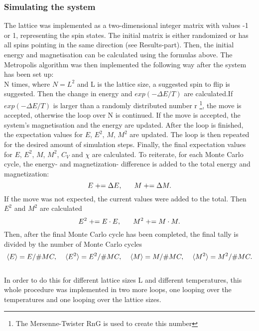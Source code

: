 \documentclass[10pt,a4paper]{article}
\begin{document}
\subsubsection{Simulating the system}
The lattice was implemented as a two-dimensional integer matrix with values -1 or 1, representing the spin states. The initial matrix is either randomized or has all spins pointing in the same direction (see Results-part). 
Then, the initial energy and magnetisation can be calculated using the formulas above.
The Metropolis algorithm was then implemented the following way after the system has been set up:\\
N times, where $N=L^2$ and L is the lattice size, a suggested spin to flip is suggested. Then the change in energy and $exp(-\Delta E/T)$ are calculated.If $exp(-\Delta E/T)$ is larger than a randomly distributed number r \footnote{The Mersenne-Twister RnG is used to create this number}, the move is accepted, otherwise the loop over N is continued. If the move is accepted, the system's magnetisation and the energy are updated. After the loop is finished, the expectation values for $E$, $E^2$, $M$, $M^2$ are updated. The loop is then repeated for the desired amount of simulation steps. Finally, the final expectation values for $E$, $E^2$, $M$, $M^2$, $C_V$ and $\chi$ are calculated. To reiterate, for each Monte Carlo cycle, the energy- and magnetization- difference is added to the total energy and magnetization:
\begin{equation*}
E \mathrel{{+}{=}} \Delta E,\hspace{6mm} M\mathrel{{+}{=}} \Delta M.
\end{equation*}
If the move was not expected, the current values were added to the total.
Then $E^2$ and $M^2$ are calculated
\begin{equation*}
E^2 \mathrel{{+}{=}}E\cdot E,\hspace{6mm} M^2 \mathrel{{+}{=}} M\cdot M.
\end{equation*}
Then, after the final Monte Carlo cycle has been completed, the final tally is divided by the number of Monte Carlo cycles
\begin{equation*}
\braket{E} = E/\#MC,\hspace{4mm}\braket{E^2} =E^2/\#MC,\hspace{4mm}\braket{M} = M/\#MC,\hspace{4mm}\braket{M^2} =M^2/\#MC.
\end{equation*}\\
In order to do this for different lattice sizes L and different temperatures, this whole procedure was implemented in two more loops, one looping over the temperatures and one looping over the lattice sizes.
\end{document}
